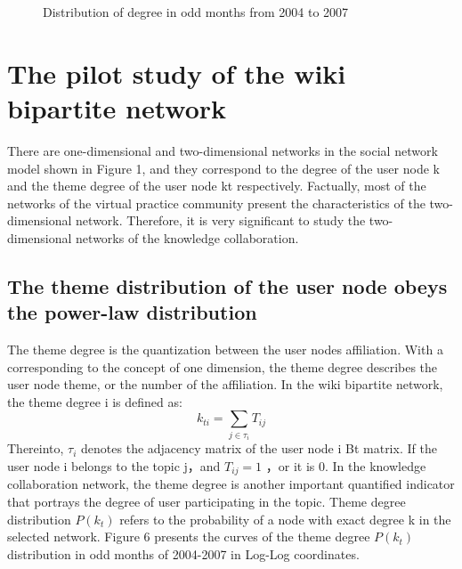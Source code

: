 \documentclass{elsarticle}
\begin{document}
\begin{figure}[p]
  \centering
  \subfigure[a]{
     \scalebox{0.3}{\texttt{[image: 05-1]}}
   } \quad
  \subfigure[b]{ 
       \scalebox{0.3}{\texttt{[image: 05-2]}}
   } 
   \end{figure}
   \begin{figure}[p]
    \subfigure[c]{
     \scalebox{0.3}{\texttt{[image: 05-3]}}
   } \quad
  \subfigure[d]{ 
       \scalebox{0.3}{\texttt{[image: 05-4]}}
   } 
    \end{figure}
   \begin{figure}[p]
    \subfigure[e]{
     \scalebox{0.3}{\texttt{[image: 05-5]}}
   } \quad
  \subfigure[f]{ 
       \scalebox{0.3}{\texttt{[image: 05-6]}}
   } 
   \caption{Distribution of degree in odd months from 2004 to 2007}
\end{figure}

\section{The pilot study of the wiki bipartite network}
\label{sec:4the-pilot-study}

There are one-dimensional and two-dimensional networks in the social
network model shown in Figure 1, and they correspond to the degree of
the user node k and the theme degree of the user node kt
respectively. Factually, most of the networks of the virtual practice
community present the characteristics of the two-dimensional
network. Therefore, it is very significant to study the
two-dimensional networks of the knowledge collaboration. 

\subsection{The theme distribution of the user node obeys the power-law distribution}
\label{sec:theme-distr-user}

The theme degree is the quantization between the user nodes
affiliation. With a corresponding to the concept of one dimension, the
theme degree describes the user node theme, or the number of the
affiliation. In the wiki bipartite network, the theme degree i is
defined as:
\begin{equation}
  \label{eq:1}
  k_{ti}=\sum_{j \in \tau_i} T_{ij}
\end{equation}
Thereinto, $\tau_i$ denotes the adjacency matrix of the user node i Bt
matrix. If the user node i belongs to the topic j，and $T_{ij}=1$ ，or
it is 0. In the knowledge collaboration network, the theme degree is
another important quantified indicator that portrays the degree of
user participating in the topic. Theme degree distribution $P(k_t)$
refers to the probability of a node with exact degree k in the
selected network. Figure 6 presents the curves of the theme degree
$P(k_t)$  distribution  in odd months of 2004-2007 in Log-Log
coordinates. 
\end{document}
